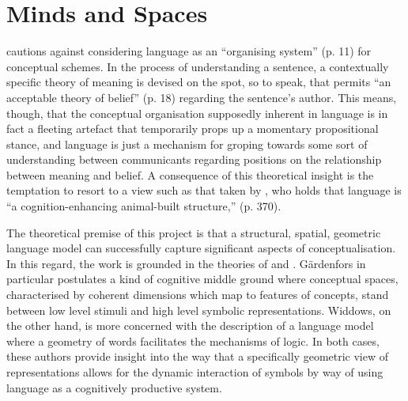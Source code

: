 \section{Minds and Spaces}
\cite{Davidson} cautions against considering language as an ``organising system'' (p. 11) for conceptual schemes.  In the process of understanding a sentence, a contextually specific theory of meaning is devised on the spot, so to speak, that permits ``an acceptable theory of belief'' (p. 18) regarding the sentence's author.  This means, though, that the conceptual organisation supposedly inherent in language is in fact a fleeting artefact that temporarily props up a momentary propositional stance, and language is just a mechanism for groping towards some sort of understanding between communicants regarding positions on the relationship between meaning and belief.  A consequence of this theoretical insight is the temptation to resort to a view such as that taken by \cite{Clark}, who holds that language is ``a cognition-enhancing animal-built structure,'' (p. 370).

The theoretical premise of this project is that a structural, spatial, geometric language model can successfully capture significant aspects of conceptualisation.  In this regard, the work is grounded in the theories of \cite{Gardenfors} and \cite{Widdows}.  G\"{a}rdenfors in particular postulates a kind of cognitive middle ground where conceptual spaces, characterised by coherent dimensions which map to features of concepts, stand between low level stimuli and high level symbolic representations.  Widdows, on the other hand, is more concerned with the description of a language model where a geometry of words facilitates the mechanisms of logic.  In both cases, these authors provide insight into the way that a specifically geometric view of representations allows for the dynamic interaction of symbols by way of using language as a cognitively productive system.

